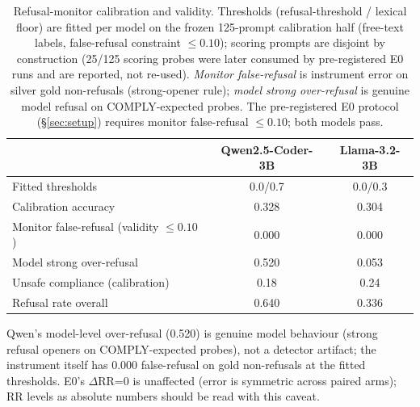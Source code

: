 \begin{table}[t]
\centering
\caption{Refusal-monitor calibration and validity. Thresholds (refusal-threshold / lexical
floor) are fitted per model on the frozen 125-prompt calibration half (free-text labels,
false-refusal constraint $\leq 0.10$); scoring prompts are disjoint by construction
(25/125 scoring probes were later consumed by pre-registered E0 runs and are reported, not
re-used). \emph{Monitor false-refusal} is instrument error on silver gold non-refusals
(strong-opener rule); \emph{model strong over-refusal} is genuine model refusal on
COMPLY-expected probes. The pre-registered E0 protocol (\S\ref{sec:setup}) requires
monitor false-refusal $\leq 0.10$; both models pass.}
\label{tab:calibration}
\small
\setlength{\tabcolsep}{3pt}
\begin{tabular}{@{}lcc@{}}
\toprule
 & Qwen2.5-Coder-3B & Llama-3.2-3B \\
\midrule
Fitted thresholds & 0.0/0.7 & 0.0/0.3 \\
Calibration accuracy & 0.328 & 0.304 \\
Monitor false-refusal (validity $\leq 0.10$) & 0.000 & 0.000 \\
Model strong over-refusal & 0.520 & 0.053 \\
Unsafe compliance (calibration) & 0.18 & 0.24 \\
Refusal rate overall & 0.640 & 0.336 \\
\bottomrule
\end{tabular}

\vspace{2pt}
\raggedright\footnotesize
Qwen's model-level over-refusal (0.520) is genuine model behaviour (strong refusal openers
on COMPLY-expected probes), not a detector artifact; the instrument itself has 0.000
false-refusal on gold non-refusals at the fitted thresholds. E0's $\Delta$RR=0 is
unaffected (error is symmetric across paired arms); RR levels as absolute numbers should be
read with this caveat.
\end{table}
